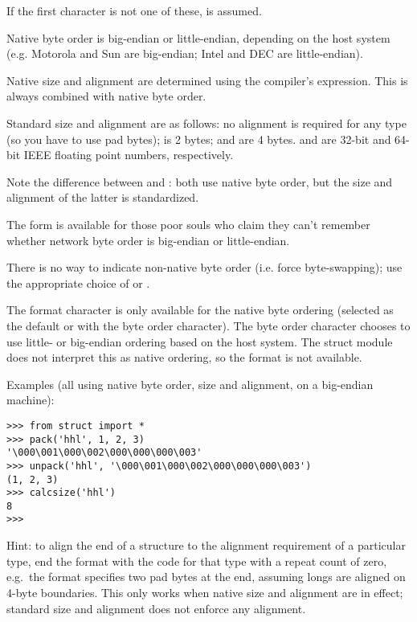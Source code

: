 If the first character is not one of these,  is assumed.

Native byte order is big-endian or little-endian, depending on the
host system (e.g. Motorola and Sun are big-endian; Intel and DEC are
little-endian).

Native size and alignment are determined using the \C{} compiler's
 expression.  This is always combined with native byte
order.

Standard size and alignment are as follows: no alignment is required
for any type (so you have to use pad bytes);  is 2 bytes;
 and  are 4 bytes.   and
 are 32-bit and 64-bit IEEE floating point numbers,
respectively.

Note the difference between  and \character{=}: both use
native byte order, but the size and alignment of the latter is
standardized.

The form \character{!} is available for those poor souls who claim they
can't remember whether network byte order is big-endian or
little-endian.

There is no way to indicate non-native byte order (i.e. force
byte-swapping); use the appropriate choice of \character{<} or
\character{>}.

The  format character is only available for the native
byte ordering (selected as the default or with the  byte
order character). The byte order character \character{=} chooses to
use little- or big-endian ordering based on the host system. The
struct module does not interpret this as native ordering, so the
 format is not available.

Examples (all using native byte order, size and alignment, on a
big-endian machine):

\begin{verbatim}
>>> from struct import *
>>> pack('hhl', 1, 2, 3)
'\000\001\000\002\000\000\000\003'
>>> unpack('hhl', '\000\001\000\002\000\000\000\003')
(1, 2, 3)
>>> calcsize('hhl')
8
>>> 
\end{verbatim}

Hint: to align the end of a structure to the alignment requirement of
a particular type, end the format with the code for that type with a
repeat count of zero, e.g.\ the format  specifies two
pad bytes at the end, assuming longs are aligned on 4-byte boundaries.
This only works when native size and alignment are in effect;
standard size and alignment does not enforce any alignment.

\begin{seealso}
\end{seealso}
